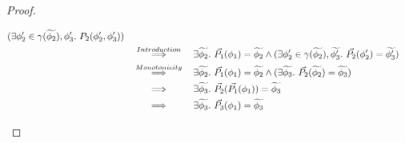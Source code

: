 \begin{proof}
\begin{description}
\begin{align*}
        (\exists \phi_2' \in \gamma(\widetilde{\phi_2}), \phi_3'.~ P_2(\phi_2', \phi_3'))\\
        & \overset{Introduction}{~\quad\quad\implies\quad\quad~} 
        \exists \widetilde{\phi_2}.~ \vec{P_1}(\phi_1) = \widetilde{\phi_2} \wedge 
        (\exists \phi_2' \in \gamma(\widetilde{\phi_2}), \widetilde{\phi_3'}.~ \vec{P_2}(\phi_2') = \widetilde{\phi_3'})\\
        & \overset{Monotonicity}{~\quad\quad\implies\quad\quad~} 
        \exists \widetilde{\phi_2}.~ \vec{P_1}(\phi_1) = \widetilde{\phi_2} \wedge 
        (\exists \widetilde{\phi_3}.~ \vec{P_2}(\widetilde{\phi_2}) = \widetilde{\phi_3})\\
        & \overset{}{~\quad\quad\implies\quad\quad~} 
        \exists \widetilde{\phi_3}.~ \vec{P_2}(\vec{P_1}(\phi_1)) = \widetilde{\phi_3}\\
        & \overset{}{~\quad\quad\implies\quad\quad~} 
        \exists \widetilde{\phi_3}.~ \vec{P_3}(\phi_1) = \widetilde{\phi_3}
        \end{align*}
        

\end{description}
\end{proof}
